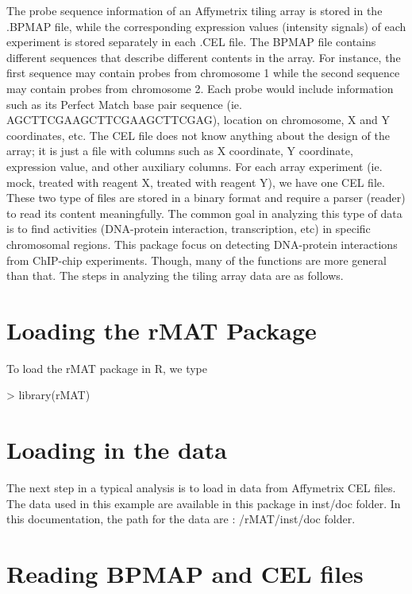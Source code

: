 \documentclass[11pt]{article}
\begin{document}
The probe sequence information of an Affymetrix tiling array is stored in the .BPMAP file, while the corresponding expression values (intensity signals) of each experiment is stored separately in each .CEL file. The BPMAP file contains different sequences that describe different contents in the array. For instance, the first sequence may contain probes from chromosome 1 while the second sequence may contain probes from chromosome 2. Each probe would include information such as its Perfect Match base pair sequence (ie. AGCTTCGAAGCTTCGAAGCTTCGAG), location on chromosome, X and Y coordinates, etc. The CEL file does not know anything about the design of the array; it is just a file with  columns such as X coordinate, Y coordinate, expression value, and other auxiliary columns. For each array experiment (ie. mock, treated with reagent X, treated with reagent Y), we have one CEL file. These two type of files are stored in a binary format and require a parser (reader) to read its content meaningfully. 
\newline
	The common goal in analyzing this type of data is to find activities (DNA-protein interaction, transcription, etc) in specific chromosomal regions. This package focus on detecting DNA-protein interactions from ChIP-chip experiments. Though, many of the functions are more general than that. The steps in analyzing the tiling array data are as follows.


\part{Loading the rMAT Package}
To load the rMAT package in R, we type 


\begin{Schunk}
\begin{Sinput}
> library(rMAT)
\end{Sinput}
\end{Schunk}

\part{Loading in the data}
The next step in a typical analysis is to load in data from Affymetrix CEL files. 
The data used in this example are available in this package in inst/doc folder. \newline 
In this documentation, the path for the data are :  /rMAT/inst/doc folder. 

\part{Reading BPMAP and CEL files}
\end{document}
